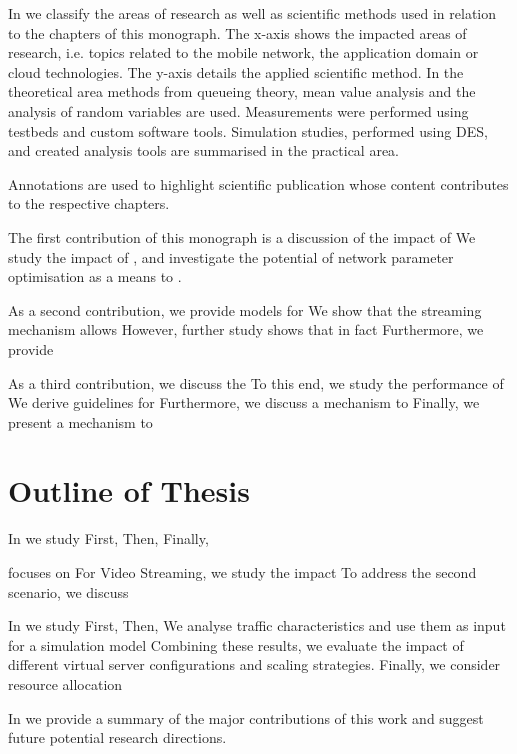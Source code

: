 In  we classify the areas of research as well as scientific methods used in relation to the chapters of this monograph.
The x-axis shows the impacted areas of research, i.e. topics related to the mobile network, the application domain or cloud technologies.
The y-axis details the applied scientific method.
In the theoretical area methods from queueing theory, mean value analysis and the analysis of random variables are used.
Measurements were performed using testbeds and custom software tools.
Simulation studies, performed using \gls{DES}, and created analysis tools are summarised in the practical area.

Annotations are used to highlight scientific publication whose content contributes to the respective chapters.

The first contribution of this monograph is a discussion of the impact of
We study the impact of , and investigate the potential of network parameter optimisation as a means to .

As a second contribution, we provide models for
We show that the streaming mechanism allows
However, further study shows that in fact
Furthermore, we provide

As a third contribution, we discuss the
To this end, we study the performance of
We derive guidelines for
Furthermore, we discuss a mechanism to
Finally, we present a mechanism to

\section{Outline of Thesis}\label{sec:introduction:outline}

In  we study
First,
Then,
Finally,

 focuses on
For Video Streaming, we study the impact
To address the second scenario, we discuss

In  we study
First,
Then,
We analyse traffic characteristics and use them as input for a simulation model
Combining these results, we evaluate the impact of different virtual server configurations and scaling strategies.
Finally, we consider resource allocation

In  we provide a summary of the major contributions of this work and suggest future potential research directions.

